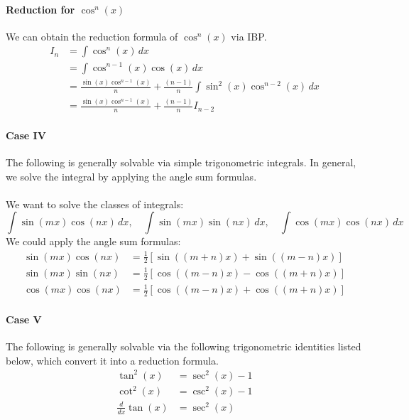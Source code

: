 \documentclass[11pt]{article}
\begin{document}
\paragraph{Reduction for $\cos^n(x)$} We can obtain the reduction formula of $\cos^n(x)$ via IBP.
\begin{align}
    I_n &= \int \cos^n(x) \, dx \nonumber \\
    &= \int \cos^{n-1}(x) \cos(x) \, dx \nonumber \\
    &= \frac{\sin(x) \cos^{n-1}(x)}{n} + \frac{(n-1)}{n} \int \sin^2(x) \cos^{n-2}(x) \, dx \nonumber \\
    &= \frac{\sin(x) \cos^{n-1}(x)}{n} + \frac{(n-1)}{n} I_{n-2}
\end{align} 
\paragraph{Case IV} The following is generally solvable via simple trigonometric integrals. In general, we solve the integral by applying the angle sum formulas.
\paragraph{} We want to solve the classes of integrals:
\begin{equation}
    \int \sin(mx) \cos(nx) \, dx, \quad \int \sin(mx) \sin(nx) \, dx, \quad \int \cos(mx) \cos(nx) \, dx 
\end{equation}
We could apply the angle sum formulas:
\begin{align}
    \sin(mx)\cos(nx) &= \frac{1}{2} \left[ \sin((m+n)x) + \sin((m-n)x) \right] \\
    \sin(mx)\sin(nx) &= \frac{1}{2} \left[ \cos((m-n)x) - \cos((m+n)x) \right] \\
    \cos(mx)\cos(nx) &= \frac{1}{2} \left[ \cos((m-n)x) + \cos((m+n)x) \right]
\end{align}
\paragraph{Case V} The following is generally solvable via the following trigonometric identities listed below, which convert it into a reduction formula.
\begin{align}
    \tan^2(x) &= \sec^2(x) - 1 \label{eq:tan2} \\
    \cot^2(x) &= \csc^2(x) - 1 \label{eq:cot2}  \\
    \frac{d}{dx} \tan(x) &= \sec^2(x)
\end{align}
\end{document}
